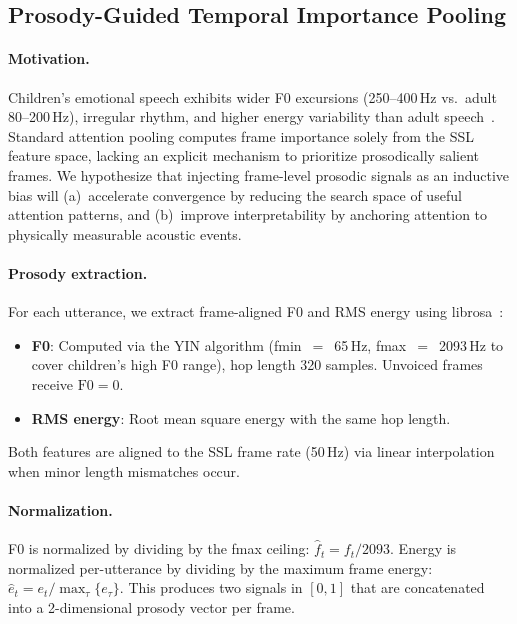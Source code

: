\subsection{Prosody-Guided Temporal Importance Pooling}
\label{ssec:prosody_pooling}

\paragraph{Motivation.}
Children's emotional speech exhibits wider F0 excursions (250--400\,Hz vs.\ adult 80--200\,Hz), irregular rhythm, and higher energy variability than adult speech~\cite{fan2024children}.
Standard attention pooling computes frame importance solely from the SSL feature space, lacking an explicit mechanism to prioritize prosodically salient frames.
We hypothesize that injecting frame-level prosodic signals as an inductive bias will (a)~accelerate convergence by reducing the search space of useful attention patterns, and (b)~improve interpretability by anchoring attention to physically measurable acoustic events.

\paragraph{Prosody extraction.}
For each utterance, we extract frame-aligned F0 and RMS energy using librosa~\cite{mcfee2015librosa}:
\begin{itemize}
\item \textbf{F0}: Computed via the YIN algorithm (fmin~$=$~65\,Hz, fmax~$=$~2093\,Hz to cover children's high F0 range), hop length 320 samples. Unvoiced frames receive $\text{F0}=0$.
\item \textbf{RMS energy}: Root mean square energy with the same hop length.
\end{itemize}
Both features are aligned to the SSL frame rate (50\,Hz) via linear interpolation when minor length mismatches occur.

\paragraph{Normalization.}
F0 is normalized by dividing by the fmax ceiling: $\hat{f}_t = f_t / 2093$.
Energy is normalized per-utterance by dividing by the maximum frame energy: $\hat{e}_t = e_t / \max_{\tau}\{e_\tau\}$.
This produces two signals in $[0, 1]$ that are concatenated into a 2-dimensional prosody vector per frame.

